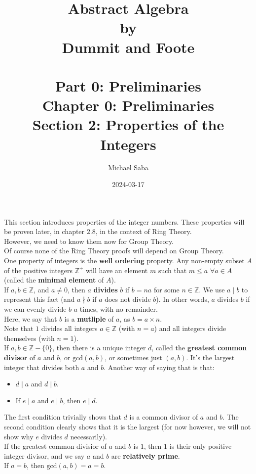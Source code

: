 \documentclass[12pt]{article}
\title{%
    \Huge Abstract Algebra \\
    \large by \\
    \Large Dummit and Foote \\~\\
    \huge Part 0: Preliminaries \\
    \LARGE Chapter 0: Preliminaries \\
    \Large Section 2: Properties of the Integers
}
\date{2024-03-17}
\author{Michael Saba}
\newcommand{\Z}{\mathbb{Z}}
\begin{document}
    \maketitle
    \newpage

    This section introduces properties of the integer numbers.
    These properties will be proven later, in chapter $2.8$,
    in the context of Ring Theory. \\
    However, we need to know them now for Group Theory. \\
    Of course none of the Ring Theory proofs will depend
    on Group Theory. \\

    One property of integers is the \textbf{well ordering} property.
    Any non-empty subset $A$ of the positive integers $\Z^+$
    will have an element $m$
    such that $m \leqslant a$ $\forall a \in A$
    (called the \textbf{minimal element} of $A$). \\

    If $a, b \in \Z$, and $a \neq 0$,
    then $a$ \textbf{divides} $b$ if $b = na$ for some $n \in \Z$.
    We use $a \mid b$ to represent this fact
    (and $a \nmid b$ if $a$ does not divide $b$).
    In other words, $a$ divides $b$ if we can evenly divide
    $b$ $a$ times, with no remainder. \\
    Here, we say that $b$ is a \textbf{mutliple} of $a$,
    as $b = a \times n$. \\
    Note that $1$ divides all integers $a \in \Z$ (with $n = a$)
    and all integers divide themselves (with $n = 1$). \\
    

    If $a, b \in \Z - \{0\}$,
    then there is a unique integer $d$,
    called the \textbf{greatest common divisor} of $a$ and $b$,
    or $\text{gcd}(a, b)$, or sometimes just $(a, b)$.
    It's the largest integer that divides both $a$ and $b$.
    Another way of saying that is that:
    \begin{itemize}[label=$\diamond$]
        \item 
            $d \mid a$ and $d \mid b$.
        \item
            If $e \mid a$ and $e \mid b$, then $e \mid d$.
    \end{itemize}
    The first condition trivially shows that $d$ is a common divisor
    of $a$ and $b$.
    The second condition clearly shows that it is the largest
    (for now however, we will not show why $e$ divides $d$
    necessarily). \\
    If the greatest common divisior of $a$ and $b$ is $1$,
    then $1$ is their only positive integer divisor, 
    and we say $a$ and $b$ are \textbf{relatively prime}. \\
    If $a = b$, then $\text{gcd}(a, b) = a = b$. \\
 
\end{document}
